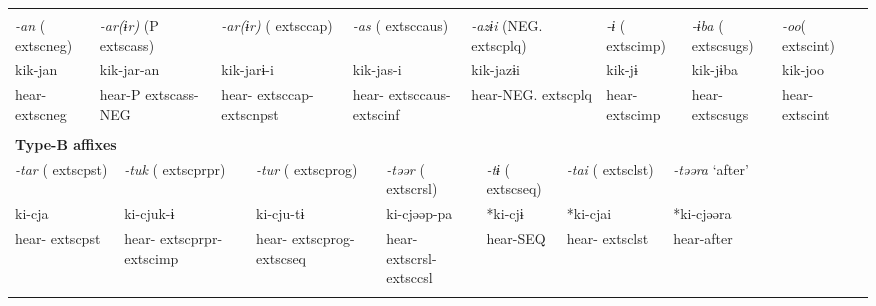 \tabletail{}
\tablelasttail{}
\begin{tabularx}{\textwidth}{XXXXXXXXXXXXXXXXXXXXXXX}
\lsptoprule
\multicolumn{23}{X}{{\bfseries Type-A affixes}}\\
{ \textit{{}-an} (	extsc{neg})} & \multicolumn{4}{X}{{ \textit{{}-ar(ɨr)} (P	extsc{ass})}} & \multicolumn{4}{X}{{ \textit{{}-ar(ɨr)} (	extsc{cap})}} & \multicolumn{4}{X}{{ \textit{{}-as} (	extsc{caus})}} & \multicolumn{5}{X}{{ \textit{{}-azɨi} (NEG.	extsc{plq})}} & \multicolumn{2}{X}{{ \textit{{}-ɨ} (	extsc{imp})}} & { \textit{{}-ɨba} (	extsc{sugs})} & { \textit{{}-oo}(	extsc{int})} & \\
{ kik-jan} & \multicolumn{4}{X}{{ kik-jar-an}} & \multicolumn{4}{X}{{ kik-jarɨ-i}} & \multicolumn{4}{X}{{ kik-jas-i}} & \multicolumn{5}{X}{{ kik-jazɨi}} & \multicolumn{2}{X}{{ kik-jɨ}} & { kik-jɨba} & { kik-joo} & \\
hear-	extsc{neg} & \multicolumn{4}{X}{hear-P	extsc{ass}-NEG} & \multicolumn{4}{X}{hear-	extsc{cap}-	extsc{npst}} & \multicolumn{4}{X}{hear-	extsc{caus}-	extsc{inf}} & \multicolumn{5}{X}{hear-NEG.	extsc{plq}} & \multicolumn{2}{X}{hear-	extsc{imp}} & hear-	extsc{sugs} & hear-	extsc{int} & \\
\multicolumn{23}{X}{}\\
\multicolumn{23}{X}{{\bfseries Type-B affixes}}\\
\multicolumn{2}{X}{{ \textit{{}-tar} (	extsc{pst})}} & \multicolumn{4}{X}{{ \textit{{}-tuk} (	extsc{prpr})}} & \multicolumn{4}{X}{{ \textit{{}-tur} (	extsc{prog})}} & \multicolumn{4}{X}{{ \textit{{}-təər} (	extsc{rsl})}} & \multicolumn{3}{X}{{ \textit{{}-tɨ} (	extsc{seq})}} & \multicolumn{2}{X}{{ \textit{{}-tai} (	extsc{lst})}} & \multicolumn{4}{X}{{ \textit{{}-təəra} ‘after’}}\\
\multicolumn{2}{X}{{ ki-cja}} & \multicolumn{4}{X}{{ ki-cjuk-ɨ}} & \multicolumn{4}{X}{{ ki-cju-tɨ}} & \multicolumn{4}{X}{{ ki-cjəəp-pa}} & \multicolumn{3}{X}{{ *ki-cjɨ}} & \multicolumn{2}{X}{{ *ki-cjai}} & \multicolumn{4}{X}{{ *ki-cjəəra}}\\
\multicolumn{2}{X}{hear-	extsc{pst}} & \multicolumn{4}{X}{hear-	extsc{prpr}-	extsc{imp}} & \multicolumn{4}{X}{hear-	extsc{prog}-	extsc{seq}} & \multicolumn{4}{X}{hear-	extsc{rsl}-	extsc{csl}} & \multicolumn{3}{X}{hear-SEQ} & \multicolumn{2}{X}{hear-	extsc{lst}} & \multicolumn{4}{X}{{ hear-after}}\\
\multicolumn{2}{X}{} & \multicolumn{4}{X}{} & \multicolumn{4}{X}{} & \multicolumn{4}{X}{} & \multicolumn{3}{X}{} & \multicolumn{2}{X}{} & \multicolumn{4}{X}{}\\

\end{tabularx}
